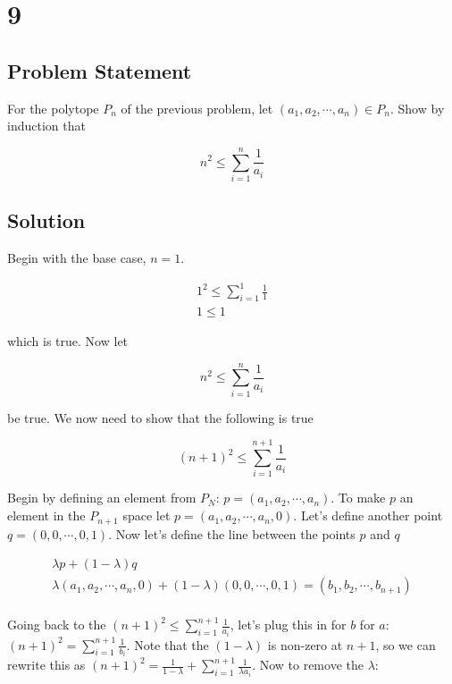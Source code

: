 \documentclass[11pt,a4paper,final]{article}
\begin{document}
\section{9}
\label{sec:orgfc784fd}
\subsection{Problem Statement}
\label{sec:org8a6e796}
For the polytope \(P_n\) of the previous problem, let \((a_1, a_2, \cdots, a_n) \in P_n\). Show by induction that

$$
n^2 \le \sum_{i=1}^n \frac{1}{a_i}
$$

\subsection{Solution}
\label{sec:org823dc79}
Begin with the base case, \(n=1\).

\begin{equation*}
\begin{array}{c}
1^2 \le \sum_{i=1}^1 \frac{1}{1} \\
1 \le 1
\end{array}
\end{equation*}

which is true. Now let

$$
n^2 \le \sum_{i=1}^n \frac{1}{a_i}
$$

be true. We now need to show that the following is true

$$
(n+1)^2 \le \sum_{i=1}^{n+1} \frac{1}{a_i}
$$

Begin by defining an element from \(P_N\): \(p = (a_1, a_2, \cdots, a_n)\). To make \(p\) an element in the \(P_{n+1}\) space let \(p
= (a_1, a_2, \cdots, a_n, 0)\). Let's define another point \(q = (0, 0, \cdots, 0, 1)\). Now let's define the line between the points
\(p\) and \(q\)

\begin{equation*}
\begin{array}{c}
\lambda p + (1 - \lambda)q \\
\lambda (a_1, a_2, \cdots, a_n, 0) + (1 - \lambda)(0, 0, \cdots, 0, 1) = (b_1, b_2, \cdots, b_{n+1}) \\
\end{array}
\end{equation*}

Going back to the \((n+1)^2 \le \sum_{i=1}^{n+1} \frac{1}{a_i}\), let's plug this in for \(b\) for \(a\): \((n+1)^2 = \sum_{i=1}^{n+1}
\frac{1}{b_i}\). Note that the \((1-\lambda)\) is non-zero at \(n+1\), so we can rewrite this as \((n+1)^2 = \frac{1}{1-\lambda} + \sum_{i=1}^{n+1}
\frac{1}{\lambda a_i}\). Now to remove the \(\lambda\):
\end{document}
